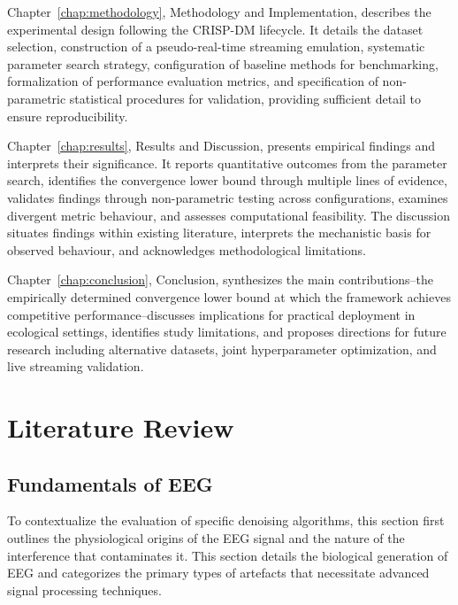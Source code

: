 \documentclass[MScCS,12pt,oneside,final]{uccthesis}
\begin{document}
Chapter~\ref{chap:methodology}, Methodology and Implementation, describes the experimental design following the CRISP-DM lifecycle. It details the dataset selection, construction of a pseudo-real-time streaming emulation, systematic parameter search strategy, configuration of baseline methods for benchmarking, formalization of performance evaluation metrics, and specification of non-parametric statistical procedures for validation, providing sufficient detail to ensure reproducibility.

Chapter~\ref{chap:results}, Results and Discussion, presents empirical findings and interprets their significance. It reports quantitative outcomes from the parameter search, identifies the convergence lower bound through multiple lines of evidence, validates findings through non-parametric testing across configurations, examines divergent metric behaviour, and assesses computational feasibility. The discussion situates findings within existing literature, interprets the mechanistic basis for observed behaviour, and acknowledges methodological limitations.

Chapter~\ref{chap:conclusion}, Conclusion, synthesizes the main contributions--the empirically determined convergence lower bound at which the framework achieves competitive performance--discusses implications for practical deployment in ecological settings, identifies study limitations, and proposes directions for future research including alternative datasets, joint hyperparameter optimization, and live streaming validation.

\chapter{Literature Review}
\label{chap:literature_review}
    
    \section{Fundamentals of EEG}
    \label{sec:fundamentals_eeg}
    
    To contextualize the evaluation of specific denoising algorithms, this section 
first outlines the physiological origins of the EEG signal and the nature of the 
interference that contaminates it. This section details the biological generation of EEG and categorizes the primary types of artefacts that necessitate advanced signal processing techniques.
\end{document}
